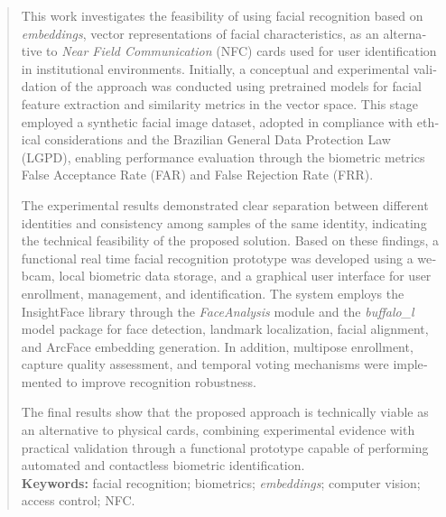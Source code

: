 \begin{otherlanguage}{english}
    \begin{abstract}
    \thispagestyle{empty}
This work investigates the feasibility of using facial recognition based on \textit{embeddings}, vector representations of facial characteristics, as an alternative to \textit{Near Field Communication} (NFC) cards used for user identification in institutional environments. Initially, a conceptual and experimental validation of the approach was conducted using pretrained models for facial feature extraction and similarity metrics in the vector space. This stage employed a synthetic facial image dataset, adopted in compliance with ethical considerations and the Brazilian General Data Protection Law (LGPD), enabling performance evaluation through the biometric metrics False Acceptance Rate (FAR) and False Rejection Rate (FRR).

The experimental results demonstrated clear separation between different identities and consistency among samples of the same identity, indicating the technical feasibility of the proposed solution. Based on these findings, a functional real time facial recognition prototype was developed using a webcam, local biometric data storage, and a graphical user interface for user enrollment, management, and identification. The system employs the InsightFace library through the \textit{FaceAnalysis} module and the \textit{buffalo\_l} model package for face detection, landmark localization, facial alignment, and ArcFace embedding generation. In addition, multipose enrollment, capture quality assessment, and temporal voting mechanisms were implemented to improve recognition robustness.

The final results show that the proposed approach is technically viable as an alternative to physical cards, combining experimental evidence with practical validation through a functional prototype capable of performing automated and contactless biometric identification.
\\[0.5em]
\textbf{Keywords:} facial recognition; biometrics; \textit{embeddings}; computer vision; access control; \acs{NFC}.
\end{abstract}
\end{otherlanguage}
